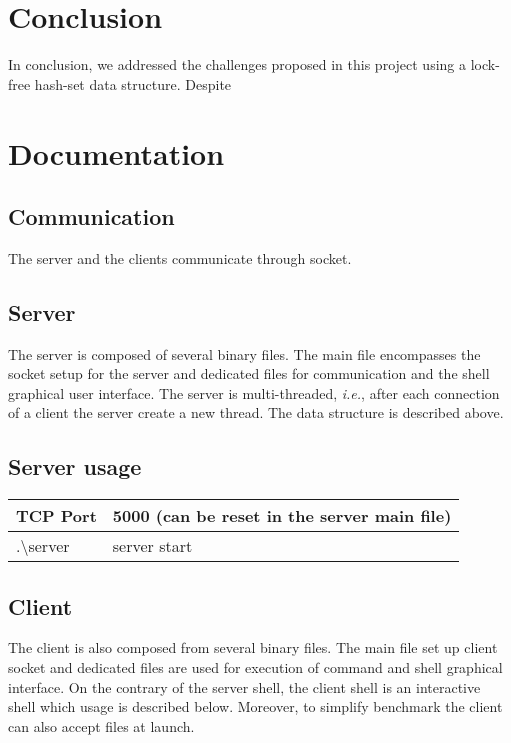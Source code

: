 \documentclass[a4paper,11pt]{report}
\begin{document}
  \section*{Conclusion}
  In conclusion, we addressed the challenges proposed in this project using a lock-free hash-set data structure.
  Despite
  \printbibliography

  \newpage

  \section*{Documentation}

  \subsection*{Communication}
  The server and the clients communicate through socket.

  \subsection*{Server}
  The server is composed of several binary files.
  The main file encompasses the socket setup for the server and dedicated files for communication and the shell graphical user interface.
  The server is multi-threaded, \textit{i.e.}, after each connection of a client the server create a new thread.
  The data structure is described above.


  \subsection*{Server usage}

  \begin{centering}
    \begin{tabular}{|m{3cm}|m{7cm}|}
      \hline
      TCP Port & 5000 (can be reset in the server main file) \\
      \hline
      .\textbackslash server & server start \\
      \hline
    \end{tabular}
  \end{centering}

  \subsection*{Client}
  The client is also composed from several binary files.
  The main file set up client socket and dedicated files are used for execution of command and shell graphical interface.
  On the contrary of the server shell, the client shell is an interactive shell which usage is described below.
  Moreover, to simplify benchmark the client can also accept files at launch.
\end{document}
